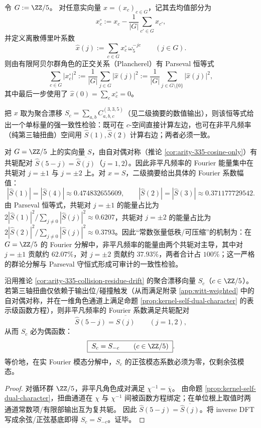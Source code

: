 \begin{remark}\label{rem:arity-335-parseval-bias}
令 \(G:=\ZZ/5\)。
对任意实向量 \(x=(x_c)_{c\in G}\)，记其去均值部分为
\[
x_c^\circ:=x_c-\frac{1}{|G|}\sum_{c'\in G}x_{c'},
\]
并定义离散傅里叶系数
\[
\widehat x(j):=\sum_{c\in G}x_c^\circ\,\omega_5^{-jc}\qquad(j\in G).
\]
则由有限阿贝尔群角色的正交关系（Plancherel）有 Parseval 恒等式
\[
\sum_{c\in G}\bigl|x_c^\circ\bigr|^2
:=\frac{1}{|G|}\sum_{j\in G}\bigl|\widehat x(j)\bigr|^2
:=\frac{1}{|G|}\sum_{j\in G\setminus\{0\}}\bigl|\widehat x(j)\bigr|^2,
\]
其中最后一步使用了 \(\widehat x(0)=\sum_c x_c^\circ=0\)。
\par
把 \(x\) 取为聚合漂移 \(S_c=\sum_{a,b}C^{(3,3,5)}_{a,b,c}\)（见二级摘要的数值输出），则该恒等式给出一个单标量的强一致性检验：既可在 \(c\)-空间直接计算左边，也可在非平凡频率（纯第三轴扭曲）空间用 \(\widehat S(1),\widehat S(2)\) 计算右边；两者必须一致。
\par
对 \(G=\ZZ/5\) 上的实向量 \(S\)，由自对偶对称（推论 \ref{cor:arity-335-cosine-only}）有共轭配对 \(\widehat S(5-j)=\overline{\widehat S(j)}\)（\(j=1,2\)）。因此非平凡频率的 Fourier 能量集中在共轭对 \(j=\pm 1\) 与 \(j=\pm 2\) 上。对 \(x=S\)，二级摘要给出具体的 Fourier 系数幅值：
\[
|\widehat S(1)|=|\widehat S(4)|\approx 0.474832655609,\qquad |\widehat S(2)|=|\widehat S(3)|\approx 0.371177729542.
\]
由 Parseval 恒等式，共轭对 \(j=\pm 1\) 的能量占比为 \(2|\widehat S(1)|^2/\sum_{j\neq 0}|\widehat S(j)|^2\approx 0.6207\)，共轭对 \(j=\pm 2\) 的能量占比为 \(2|\widehat S(2)|^2/\sum_{j\neq 0}|\widehat S(j)|^2\approx 0.3793\)。因此``常数张量低秩/可压缩''的机制为：在 \(G=\ZZ/5\) 的 Fourier 分解中，非平凡频率的能量由两个共轭对主导，其中对 \(j=\pm 1\) 贡献约 \(62.07\%\)，对 \(j=\pm 2\) 贡献约 \(37.93\%\)，两者合计占 \(100\%\)；这一严格的群论分解与 Parseval 守恒式形成可审计的一致性检验。
\end{remark}

\begin{corollary}\label{cor:arity-335-cosine-only}
沿用推论 \ref{cor:arity-335-collision-residue-drift} 的聚合漂移向量 \(S_c\)（\(c\in\ZZ/5\)）。
若第三轴扭曲仅依赖于输出位/碰撞触发（从而满足附录 \ref{app:witt-weighted} 中的自对偶对称，并在一维角色通道上满足命题 \ref{prop:kernel-self-dual-character} 的表示级函数方程），则非平凡频率的 Fourier 系数满足共轭配对
\[
\widehat S(5-j)=\overline{\widehat S(j)}\qquad(j=1,2),
\]
从而 \(S_c\) 必为偶函数：
\[
\boxed{\;
S_c=S_{-c}\qquad(c\in\ZZ/5)\; }.
\]
等价地，在实 Fourier 模态分解中，\(S_c\) 的正弦模态系数必须为零，仅剩余弦模态。
\end{corollary}
\begin{proof}
对循环群 \(\ZZ/5\)，非平凡角色成对满足 \(\chi^{-1}=\overline{\chi}\)。
由命题 \ref{prop:kernel-self-dual-character}，扭曲通道在 \(\chi\) 与 \(\chi^{-1}\) 间被函数方程绑定；在单位根上取值时两通道常数项/有限部输出互为复共轭。
因此 \(\widehat S(5-j)=\overline{\widehat S(j)}\)。将 inverse DFT 写成余弦/正弦基底即得 \(S_c=S_{-c}\)。证毕。
\end{proof}

